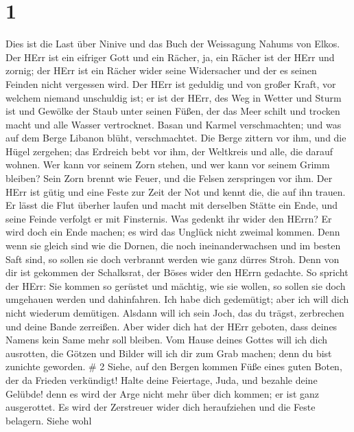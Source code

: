 \hypertarget{section}{%
\section{1}\label{section}}

 Dies ist die Last über Ninive und das Buch der Weissagung
Nahums von Elkos.  Der HErr ist ein eifriger Gott und ein
Rächer, ja, ein Rächer ist der HErr und zornig; der HErr ist ein Rächer
wider seine Widersacher und der es seinen Feinden nicht vergessen wird.
 Der HErr ist geduldig und von großer Kraft, vor welchem
niemand unschuldig ist; er ist der HErr, des Weg in Wetter und Sturm ist
und Gewölke der Staub unter seinen Füßen,  der das Meer
schilt und trocken macht und alle Wasser vertrocknet. Basan und Karmel
verschmachten; und was auf dem Berge Libanon blüht, verschmachtet.
 Die Berge zittern vor ihm, und die Hügel zergehen; das
Erdreich bebt vor ihm, der Weltkreis und alle, die darauf wohnen.
 Wer kann vor seinem Zorn stehen, und wer kann vor seinem
Grimm bleiben? Sein Zorn brennt wie Feuer, und die Felsen zerspringen
vor ihm.  Der HErr ist gütig und eine Feste zur Zeit der Not
und kennt die, die auf ihn trauen.  Er lässt die Flut
überher laufen und macht mit derselben Stätte ein Ende, und seine Feinde
verfolgt er mit Finsternis.  Was gedenkt ihr wider den
HErrn? Er wird doch ein Ende machen; es wird das Unglück nicht zweimal
kommen.  Denn wenn sie gleich sind wie die Dornen, die noch
ineinanderwachsen und im besten Saft sind, so sollen sie doch verbrannt
werden wie ganz dürres Stroh.  Denn von dir ist gekommen
der Schalksrat, der Böses wider den HErrn gedachte.  So
spricht der HErr: Sie kommen so gerüstet und mächtig, wie sie wollen, so
sollen sie doch umgehauen werden und dahinfahren. Ich habe dich
gedemütigt; aber ich will dich nicht wiederum demütigen. 
Alsdann will ich sein Joch, das du trägst, zerbrechen und deine Bande
zerreißen.  Aber wider dich hat der HErr geboten, dass
deines Namens kein Same mehr soll bleiben. Vom Hause deines Gottes will
ich dich ausrotten, die Götzen und Bilder will ich dir zum Grab machen;
denn du bist zunichte geworden. \# 2  Siehe, auf den Bergen
kommen Füße eines guten Boten, der da Frieden verkündigt! Halte deine
Feiertage, Juda, und bezahle deine Gelübde! denn es wird der Arge nicht
mehr über dich kommen; er ist ganz ausgerottet.  Es wird der
Zerstreuer wider dich heraufziehen und die Feste belagern. Siehe wohl
